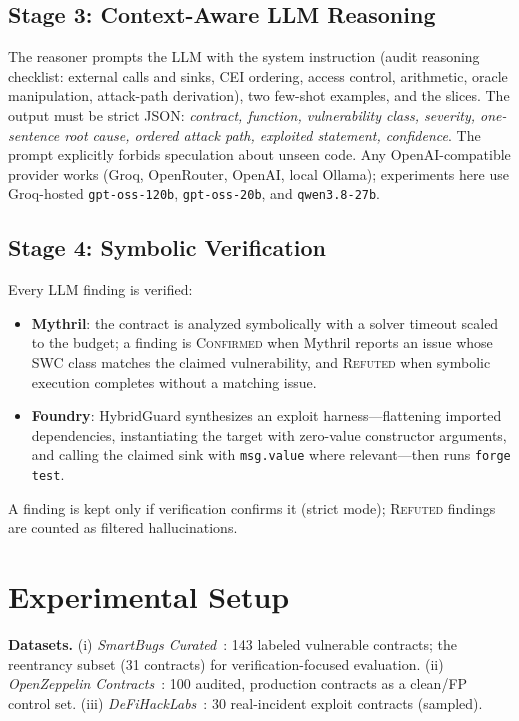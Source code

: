 \documentclass[conference]{IEEEtran}
\newcommand{\system}{HybridGuard}
\begin{document}
\subsection{Stage 3: Context-Aware LLM Reasoning}
The reasoner prompts the LLM with the system instruction (audit reasoning checklist: external calls
and sinks, CEI ordering, access control, arithmetic, oracle manipulation, attack-path derivation),
two few-shot examples, and the slices. The output must be strict JSON:
\emph{contract, function, vulnerability class, severity, one-sentence root cause, ordered attack
path, exploited statement, confidence}. The prompt explicitly forbids speculation about unseen
code. Any OpenAI-compatible provider works (Groq, OpenRouter, OpenAI, local Ollama); experiments
here use Groq-hosted \texttt{gpt-oss-120b}, \texttt{gpt-oss-20b}, and \texttt{qwen3.8-27b}.

\subsection{Stage 4: Symbolic Verification}
Every LLM finding is verified:
\begin{itemize}
  \item \textbf{Mythril}: the contract is analyzed symbolically with a solver timeout scaled to the
        budget; a finding is \textsc{Confirmed} when Mythril reports an issue whose SWC class
        matches the claimed vulnerability, and \textsc{Refuted} when symbolic execution completes
        without a matching issue.
  \item \textbf{Foundry}: \system{} synthesizes an exploit harness---flattening imported
        dependencies, instantiating the target with zero-value constructor arguments, and calling
        the claimed sink with \texttt{msg.value} where relevant---then runs \texttt{forge test}.
\end{itemize}
A finding is kept only if verification confirms it (strict mode); \textsc{Refuted} findings are
counted as filtered hallucinations.

\section{Experimental Setup}
\textbf{Datasets.} (i) \emph{SmartBugs Curated}~\cite{smartbugs}: 143 labeled vulnerable contracts;
the reentrancy subset (31 contracts) for verification-focused evaluation. (ii) \emph{OpenZeppelin
Contracts}~\cite{openzeppelin}: 100 audited, production contracts as a clean/FP control set.
(iii) \emph{DeFiHackLabs}~\cite{defihacklabs}: 30 real-incident exploit contracts (sampled).
\end{document}
